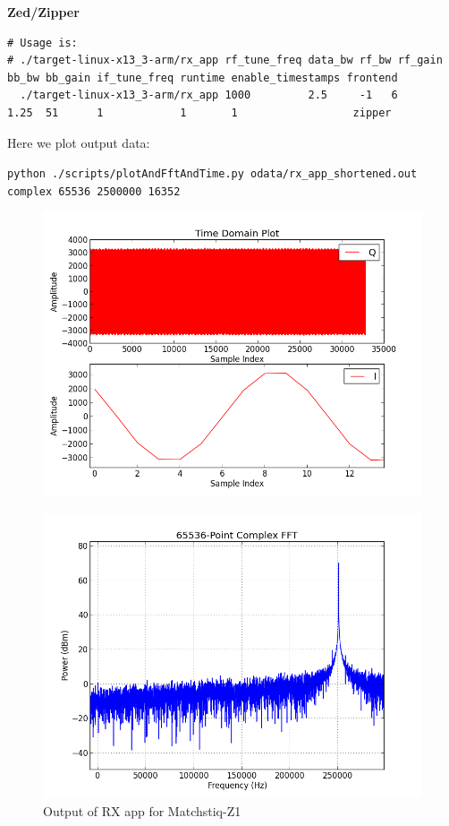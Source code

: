 \normalsize
\noindent\textbf{Zed/Zipper}\\
\scriptsize
\noindent
\begin{verbatim}
# Usage is:
# ./target-linux-x13_3-arm/rx_app rf_tune_freq data_bw rf_bw rf_gain bb_bw bb_gain if_tune_freq runtime enable_timestamps frontend
  ./target-linux-x13_3-arm/rx_app 1000         2.5     -1   6      1.25  51      1            1       1                  zipper
\end{verbatim}
\par\medskip
\small
\noindent Here we plot output data:\par\medskip
\noindent\texttt{python ./scripts/plotAndFftAndTime.py odata/rx\_app\_shortened.out complex 65536 2500000 16352}\par\medskip
\pagebreak
        \begin{figure}[h]
                \centering
                \includegraphics[scale=.5]{rx_app_sig_gen_time_domain}
                \label{fig:rx_app_sig_gen_time_domain}
        \end{figure}
        \begin{figure}[h]
                \centering
                \includegraphics[scale=.5]{rx_app_sig_gen_fft}
                \caption{Output of RX app for Matchstiq-Z1}
                \label{fig:rx_app_sig_gen_fft}
        \end{figure}
